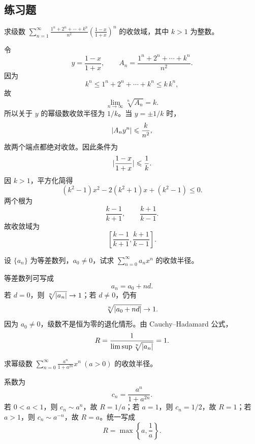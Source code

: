 \subsection{练习题}

\begin{xexercise}[1]
求级数 $\displaystyle\sum_{n=1}^{\infty}\frac{1^n+2^n+\cdots+k^n}{n^2}\left(\frac{1-x}{1+x}\right)^n$ 的收敛域，其中 $k>1$ 为整数。
\end{xexercise}
\begin{xsolution}
令
\[
  y=\frac{1-x}{1+x},
  \qquad
  A_n=\frac{1^n+2^n+\cdots+k^n}{n^2}.
\]
因为
\[
  k^n\leqslant1^n+2^n+\cdots+k^n\leqslant k\,k^n,
\]
故
\[
  \lim_{n\to\infty}\sqrt[n]{A_n}=k.
\]
所以关于 $y$ 的幂级数收敛半径为 $1/k$。当 $y=\pm1/k$ 时，
\[
  \lvert A_ny^n\rvert
  \leqslant\frac{k}{n^2},
\]
故两个端点都绝对收敛。因此条件为
\[
  \lvert\frac{1-x}{1+x}\rvert\leqslant\frac1k.
\]
因 $k>1$，平方化简得
\[
  (k^2-1)x^2-2(k^2+1)x+(k^2-1)\leqslant0.
\]
两个根为
\[
  \frac{k-1}{k+1},\qquad \frac{k+1}{k-1}.
\]
故收敛域为
\[
  \boxed{\left[\frac{k-1}{k+1},\frac{k+1}{k-1}\right]}.
\]
\end{xsolution}


\begin{xexercise}[2]
设 $\{a_n\}$ 为等差数列，$a_0\ne0$，试求 $\displaystyle\sum_{n=0}^{\infty}a_nx^n$ 的收敛半径。
\end{xexercise}
\begin{xsolution}
等差数列可写成
\[
  a_n=a_0+nd.
\]
若 $d=0$，则 $\sqrt[n]{\lvert a_n\rvert}\to1$；若 $d\ne0$，仍有
\[
  \sqrt[n]{\lvert a_0+nd\rvert}\to1.
\]
因为 $a_0\ne0$，级数不是恒为零的退化情形。由 Cauchy--Hadamard 公式，
\[
  R=\frac1{\limsup\sqrt[n]{\lvert a_n\rvert}}=1.
\]
\end{xsolution}


\begin{xexercise}[3]
求幂级数 $\displaystyle\sum_{n=0}^{\infty}\frac{a^n}{1+a^{2n}}x^n\ (a>0)$ 的收敛半径。
\end{xexercise}
\begin{xsolution}
系数为
\[
  c_n=\frac{a^n}{1+a^{2n}}.
\]
若 $0<a<1$，则 $c_n\sim a^n$，故 $R=1/a$；若 $a=1$，则 $c_n=1/2$，故 $R=1$；若 $a>1$，则 $c_n\sim a^{-n}$，故 $R=a$。统一写成
\[
  \boxed{R=\max\left\{a,\frac1a\right\}}.
\]
\end{xsolution}



